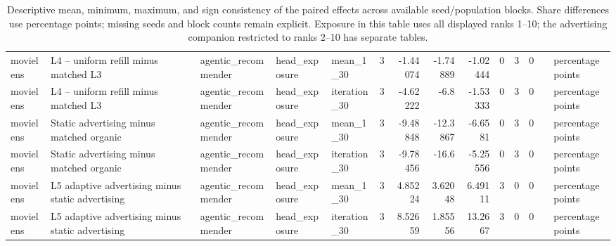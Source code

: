 \begin{table}[htbp!]
\begin{tabular}{lllllrrrrrrrll}
movielens & L4 -- uniform refill minus matched L3 & agentic\_recommender & head\_exposure & mean\_1\_30 & 3 & -1.44074 & -1.74889 & -1.02444 & 0 & 3 & 0 &  & percentage points \\
movielens & L4 -- uniform refill minus matched L3 & agentic\_recommender & head\_exposure & iteration\_30 & 3 & -4.62222 & -6.8 & -1.53333 & 0 & 3 & 0 &  & percentage points \\
movielens & Static advertising minus matched organic & agentic\_recommender & head\_exposure & mean\_1\_30 & 3 & -9.48848 & -12.3867 & -6.6581 & 0 & 3 & 0 &  & percentage points \\
movielens & Static advertising minus matched organic & agentic\_recommender & head\_exposure & iteration\_30 & 3 & -9.78456 & -16.6 & -5.25556 & 0 & 3 & 0 &  & percentage points \\
movielens & L5 adaptive advertising minus static advertising & agentic\_recommender & head\_exposure & mean\_1\_30 & 3 & 4.85224 & 3.62048 & 6.49111 & 3 & 0 & 0 &  & percentage points \\
movielens & L5 adaptive advertising minus static advertising & agentic\_recommender & head\_exposure & iteration\_30 & 3 & 8.52659 & 1.85556 & 13.2667 & 3 & 0 & 0 &  & percentage points \\
\hline
\end{tabular}
\caption{Descriptive mean, minimum, maximum, and sign consistency of the paired effects across available seed/population blocks. Share differences use percentage points; missing seeds and block counts remain explicit. Exposure in this table uses all displayed ranks 1--10; the advertising companion restricted to ranks 2--10 has separate tables.}
\label{chap:results:tab:rq1_seed_consistency_head_exposure}
\end{table}
